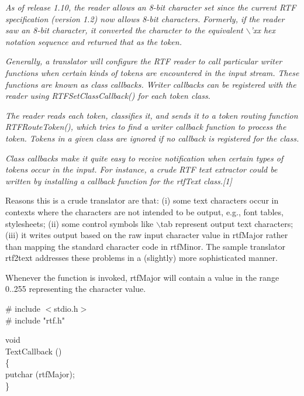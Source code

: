 \documentclass{article}
\begin{document}
{{{{{{{\noindent
{\em As of release 1.10, the reader allows an 8-bit character set since the 
current RTF specification (version 1.2) now allows 8-bit characters. Formerly, 
if the reader saw an 8-bit character, it converted the character to the equivalent 
$\backslash $'xx hex notation sequence and returned that as the token.



\noindent
{\em Generally, a translator will configure the RTF reader to call particular 
writer functions when certain kinds of tokens are encountered in the input 
stream. These functions are known as class callbacks. Writer callbacks can 
be registered with the reader using RTFSetClassCallback() for each token 
class.



\noindent
{\em The reader reads each token, classifies it, and sends it to a token 
routing function RTFRouteToken(), which tries to find a writer callback function 
to process the token. Tokens in a given class are ignored if no callback 
is registered for the class.



\noindent
{\em Class callbacks make it quite easy to receive notification when certain 
types of tokens occur in the input. For instance, a crude RTF text extractor 
could be written by installing a callback function for the rtfText class.[1]



}}}}}}}}}}}
\noindent
[1] Reasons this is a crude translator are that: (i) some text characters 
occur in contexts where the characters are not intended to be output, e.g., 
font tables, stylesheets; (ii) some control symbols like $\backslash $tab represent 
output text characters; (iii) it writes output based on the raw input character 
value in rtfMajor rather than mapping the standard character code in rtfMinor. 
The sample translator rtf2text addresses these problems in a (slightly) more 
sophisticated manner.


\noindent
Whenever the function is invoked, rtfMajor will contain a value in the range 
0..255 representing the character value.




\noindent
\# include	$<$stdio.h$>$\\
\# include	"rtf.h"



\noindent
void\\
TextCallback ()\\
\{	\\
putchar (rtfMajor);\\
\}
\end{document}
